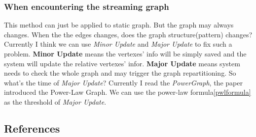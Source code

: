 \documentclass{article}
\begin{document}
	\subsubsection{When encountering the streaming graph}
	This method can just be applied to static graph. But the graph may always changes. When the the edges changes, does the graph structure(pattern) changes? Currently I think we can use \emph{Minor Update} and \emph{Major Update} to fix such a problem.
	\newline
	\textbf{Minor Update} means the vertexes' info will be simply saved and the system will update the relative vertexes' infor.
	\newline
	\textbf{Major Update} means system needs to check the whole graph and may trigger the graph repartitioning.
	\newline
	So what's the time of \emph{Major Update}? Currently I read the \emph{PowerGraph}, the paper introduced the Power-Law Graph. We can use the power-law formula\eqref{pwlformula} as the threshold of \emph{Major Update}.

	\newpage
	\begin{appendix}
		\section{References}
		
		
	\end{appendix}
\end{document}
